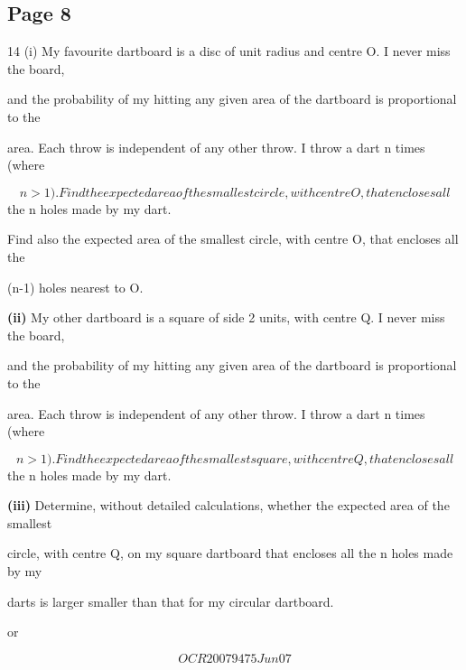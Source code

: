 \documentclass[12pt]{article}
\begin{document}
\subsection*{Page 8}
\begin{flushleft}
14 (i) My favourite dartboard is a disc of unit radius and centre O. I never miss the board,\par
and the probability of my hitting any given area of the dartboard is proportional to the\par
area. Each throw is independent of any other throw. I throw a dart n times (where\par
\[n > 1). Find the expected area of the smallest circle, with centre O, that encloses all\]
the n holes made by my dart.\par
Find also the expected area of the smallest circle, with centre O, that encloses all the\par
(n-1) holes nearest to O.\par
\textbf{(ii)} My other dartboard is a square of side 2 units, with centre Q. I never miss the board,\par
and the probability of my hitting any given area of the dartboard is proportional to the\par
area. Each throw is independent of any other throw. I throw a dart n times (where\par
\[n > 1). Find the expected area of the smallest square, with centre Q, that encloses all\]
the n holes made by my dart.\par
\textbf{(iii)} Determine, without detailed calculations, whether the expected area of the smallest\par
circle, with centre Q, on my square dartboard that encloses all the n holes made by my\par
darts is larger smaller than that for my circular dartboard.\par
or\par
\[OCR 2007 9475 Jun07\]
\end{flushleft}
\end{document}
